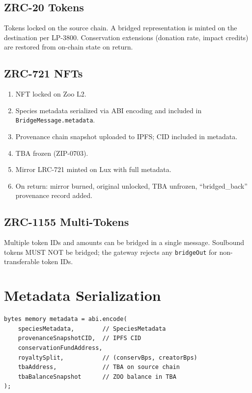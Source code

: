 \documentclass[11pt,letterpaper]{article}
\begin{document}
\subsection{ZRC-20 Tokens}

Tokens locked on the source chain. A bridged representation is minted on the destination per LP-3800. Conservation extensions (donation rate, impact credits) are restored from on-chain state on return.

\subsection{ZRC-721 NFTs}

\begin{enumerate}
    \item NFT locked on Zoo L2.
    \item Species metadata serialized via ABI encoding and included in \texttt{BridgeMessage.metadata}.
    \item Provenance chain snapshot uploaded to IPFS; CID included in metadata.
    \item TBA frozen (ZIP-0703).
    \item Mirror LRC-721 minted on Lux with full metadata.
    \item On return: mirror burned, original unlocked, TBA unfrozen, ``bridged\_back'' provenance record added.
\end{enumerate}

\subsection{ZRC-1155 Multi-Tokens}

Multiple token IDs and amounts can be bridged in a single message. Soulbound tokens MUST NOT be bridged; the gateway rejects any \texttt{bridgeOut} for non-transferable token IDs.

\section{Metadata Serialization}
\label{sec:metadata}

\begin{lstlisting}[language=Solidity,caption=ZRC-721 metadata serialization]
bytes memory metadata = abi.encode(
    speciesMetadata,        // SpeciesMetadata
    provenanceSnapshotCID,  // IPFS CID
    conservationFundAddress,
    royaltySplit,           // (conservBps, creatorBps)
    tbaAddress,             // TBA on source chain
    tbaBalanceSnapshot      // ZOO balance in TBA
);
\end{lstlisting}
\end{document}
